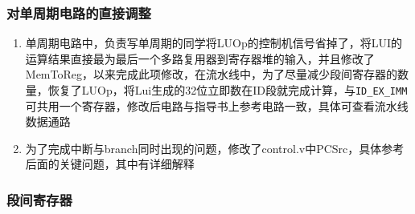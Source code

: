 \documentclass{ctexart}
\begin{document}
		\subsubsection{对单周期电路的直接调整}
		\begin{enumerate}
		\item 单周期电路中，负责写单周期的同学将LUOp的控制机信号省掉了，将LUI的运算结果直接最为最后一个多路复用器到寄存器堆的输入，并且修改了MemToReg，以来完成此项修改，在流水线中，为了尽量减少段间寄存器的数量，恢复了LUOp，将Lui生成的32位立即数在ID段就完成计算，与\verb"ID_EX_IMM"可共用一个寄存器，修改后电路与指导书上参考电路一致，具体可查看流水线数据通路
		\item 为了完成中断与branch同时出现的问题，修改了control.v中PCSrc，具体参考后面的关键问题，其中有详细解释
		\end{enumerate}

		\subsubsection{段间寄存器}
\end{document}
